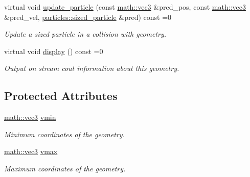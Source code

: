 \begin{DoxyCompactItemize}
virtual void \hyperlink{classphysim_1_1geometric_1_1geometry_a11c26d2fea85bf7bc41ec94cefa9729e}{update\+\_\+particle} (const \hyperlink{structphysim_1_1math_1_1vec3}{math\+::vec3} \&pred\+\_\+pos, const \hyperlink{structphysim_1_1math_1_1vec3}{math\+::vec3} \&pred\+\_\+vel, \hyperlink{classphysim_1_1particles_1_1sized__particle}{particles\+::sized\+\_\+particle} \&pred) const =0
\begin{DoxyCompactList}\small\item\em Update a sized particle in a collision with geometry. \end{DoxyCompactList}\item 
\mbox{\label{classphysim_1_1geometric_1_1geometry_a1fdaea58b350277f14ee51aedba3111e}} 
virtual void \hyperlink{classphysim_1_1geometric_1_1geometry_a1fdaea58b350277f14ee51aedba3111e}{display} () const =0
\begin{DoxyCompactList}\small\item\em Output on stream {\itshape cout} information about this geometry. \end{DoxyCompactList}\end{DoxyCompactItemize}
\subsection*{Protected Attributes}
\begin{DoxyCompactItemize}
\item 
\mbox{\label{classphysim_1_1geometric_1_1geometry_a5a573b2ff467d2fe492db9240eeff49a}} 
\hyperlink{structphysim_1_1math_1_1vec3}{math\+::vec3} \hyperlink{classphysim_1_1geometric_1_1geometry_a5a573b2ff467d2fe492db9240eeff49a}{vmin}
\begin{DoxyCompactList}\small\item\em Minimum coordinates of the geometry. \end{DoxyCompactList}\item 
\mbox{\label{classphysim_1_1geometric_1_1geometry_a75eeb09e8584ff0d2109396baf0380d4}} 
\hyperlink{structphysim_1_1math_1_1vec3}{math\+::vec3} \hyperlink{classphysim_1_1geometric_1_1geometry_a75eeb09e8584ff0d2109396baf0380d4}{vmax}
\begin{DoxyCompactList}\small\item\em Maximum coordinates of the geometry. \end{DoxyCompactList}\end{DoxyCompactItemize}


